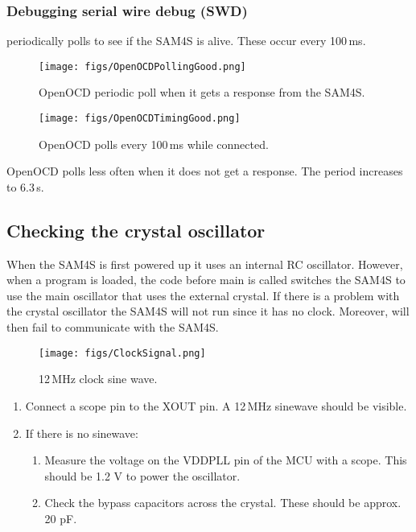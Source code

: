 \subsubsection{Debugging serial wire debug (SWD)}
\label{debugging-serial-wire-debug-swd}

 periodically polls to see if the SAM4S is alive.
These occur every 100\,ms.

\begin{figure}
\centering
\texttt{[image: figs/OpenOCDPollingGood.png]}
\caption{OpenOCD periodic poll when it gets a response from the SAM4S.}
\end{figure}

\begin{figure}
\centering
\texttt{[image: figs/OpenOCDTimingGood.png]}
\caption{OpenOCD polls every 100\,ms while connected.}
\end{figure}

OpenOCD polls less often when it does not get a response. The period
increases to 6.3\,s.

\subsection{Checking the crystal oscillator}
\label{checking-the-crystal-oscillator}

When the SAM4S is first powered up it uses an internal RC oscillator.
However, when a program is loaded, the code before main is called
switches the SAM4S to use the main oscillator that uses the external
crystal.  If there is a problem with the crystal oscillator the SAM4S
will not run since it has no clock.  Moreover,  will
then fail to communicate with the SAM4S.

\begin{figure}
\centering
\texttt{[image: figs/ClockSignal.png]}
\caption{12\,MHz clock sine wave.}
\end{figure}


\begin{enumerate}
\item
  Connect a scope pin to the XOUT pin. A 12\,MHz sinewave should be
  visible.
\item
  If there is no sinewave:

  \begin{enumerate}
  \item
    Measure the voltage on the VDDPLL pin of the MCU with a scope. This
    should be 1.2 V to power the oscillator.
  \item
    Check the bypass capacitors across the crystal. These should be
    approx. 20 pF.
  \end{enumerate}
\end{enumerate}

